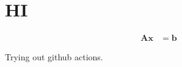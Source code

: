 \documentclass{article}
\begin{document}
\section{HI}
\begin{align}
 \mathbf{A}\mathbf{x} &= \mathbf{b}
\end{align}

Trying out github actions.
\end{document}
